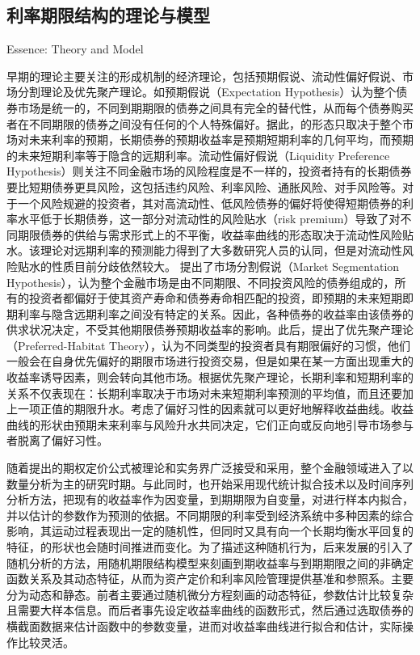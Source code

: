 \subsection{利率期限结构的理论与模型}{Essence: Theory and Model}\label{theory&model}

早期的\ts{}理论主要关注\ts 的形成机制的经济理论，包括预期假说、流动性偏好假说、市场分割理论及优先聚产理论。如预期假说（Expectation Hypothesis）认为整个债券市场是统一的，不同到期期限的债券之间具有完全的替代性，从而每个债券购买者在不同期限的债券之间没有任何的个人特殊偏好。据此，\ts 的形态只取决于整个市场对未来利率的预期，长期债券的预期收益率是预期短期利率的几何平均，而预期的未来短期利率等于\yc 隐含的远期利率。流动性偏好假说（Liquidity Preference Hypothesis）则关注不同金融市场的风险程度是不一样的，投资者持有的长期债券要比短期债券更具风险，这包括违约风险、利率风险、通胀风险、对手风险等。对于一个风险规避的投资者，其对高流动性、低风险债券的偏好将使得短期债券的利率水平低于长期债券，这一部分对流动性的风险贴水（risk premium）导致了对不同期限债券的供给与需求形式上的不平衡，收益率曲线的形态取决于流动性风险贴水。该理论对远期利率的预测能力得到了大多数研究人员的认同，但是对流动性风险贴水的性质目前分歧依然较大。 提出了市场分割假说（Market Segmentation Hypothesis），认为整个金融市场是由不同期限、不同投资风险的债券组成的，所有的投资者都偏好于使其资产寿命和债券寿命相匹配的投资，即预期的未来短期即期利率与隐含远期利率之间没有特定的关系。因此，各种债券的收益率由该债券的供求状况决定，不受其他期限债券预期收益率的影响。此后，提出了优先聚产理论（Preferred-Habitat Theory），认为不同类型的投资者具有期限偏好的习惯，他们一般会在自身优先偏好的期限市场进行投资交易，但是如果在某一方面出现重大的收益率诱导因素，则会转向其他市场。根据优先聚产理论，长期利率和短期利率的关系不仅表现在：长期利率取决于市场对未来短期利率预测的平均值，而且还要加上一项正值的期限升水。考虑了偏好习性的因素就可以更好地解释收益曲线。收益曲线的形状由预期未来利率与风险升水共同决定，它们正向或反向地引导市场参与者脱离了偏好习性。

随着提出的期权定价公式被理论和实务界广泛接受和采用，整个金融领域进入了以数量分析为主的研究时期。与此同时，\tsm 也开始采用现代统计拟合技术以及时间序列分析方法，把现有的收益率作为因变量，到期期限为自变量，对\yc 进行样本内拟合，并以估计的参数作为预测的依据。不同期限的利率受到经济系统中多种因素的综合影响，其运动过程表现出一定的随机性，但同时又具有向一个长期均衡水平回复的特征，\yc 的形状也会随时间推进而变化。为了描述这种随机行为，后来发展的\tsm 引入了随机分析的方法，用随机期限结构模型来刻画到期收益率与到期期限之间的非确定函数关系及其动态特征，从而为资产定价和利率风险管理提供基准和参照系。\tsm 主要分为动态\tsm 和静态\tsm{}。前者主要通过随机微分方程刻画\tsm 的动态特征，参数估计比较复杂且需要大样本信息。而后者事先设定收益率曲线的函数形式，然后通过选取债券的横截面数据来估计函数中的参数变量，进而对收益率曲线进行拟合和估计，实际操作比较灵活。

